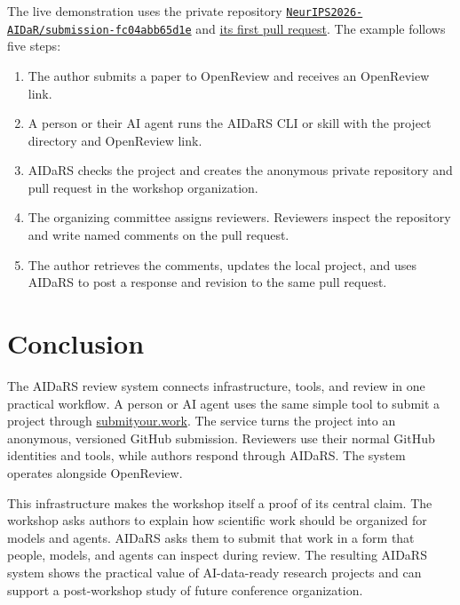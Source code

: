 \documentclass[10pt]{article}
\newcommand{\systemurl}{\href{https://submityour.work}{submityour.work}}
\begin{document}
The live demonstration uses the private repository
\href{https://github.com/NeurIPS2026-AIDaR/submission-fc04abb65d1e}{%
\texttt{NeurIPS2026-AIDaR/submission-fc04abb65d1e}} and
\href{https://github.com/NeurIPS2026-AIDaR/submission-fc04abb65d1e/pull/1}{its first pull request}.
The example follows five steps:
\begin{enumerate}
  \item The author submits a paper to OpenReview and receives an OpenReview
  link.
  \item A person or their AI agent runs the AIDaRS CLI or skill with the project
  directory and OpenReview link.
  \item AIDaRS checks the project and creates the anonymous private repository
  and pull request in the workshop organization.
  \item The organizing committee assigns reviewers. Reviewers inspect the
  repository and write named comments on the pull request.
  \item The author retrieves the comments, updates the local project, and uses
  AIDaRS to post a response and revision to the same pull request.
\end{enumerate}

\section{Conclusion}

The AIDaRS review system connects infrastructure, tools, and review in one
practical workflow. A person or AI agent uses the same simple tool to submit a
project through \systemurl{}. The service turns the project into an anonymous,
versioned GitHub submission. Reviewers use their normal GitHub identities and
tools, while authors respond through AIDaRS. The system operates alongside
OpenReview.

This infrastructure makes the workshop itself a proof of its central claim.
The workshop asks authors to explain how scientific work should be organized
for models and agents. AIDaRS asks them to submit that work in a form that people,
models, and agents can inspect during review. The resulting AIDaRS system shows
the practical value of AI-data-ready research projects and can support a
post-workshop study of future conference organization.
\end{document}
